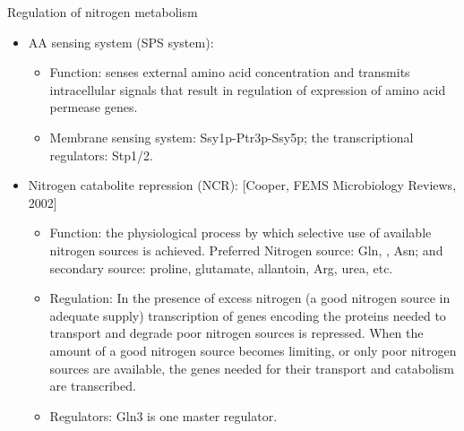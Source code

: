 \documentclass{report}
\begin{document}
Regulation of nitrogen metabolism
\begin{itemize}
\item AA sensing system (SPS system): 
\begin{itemize}
	\item Function: senses external amino acid concentration and transmits intracellular signals that result in regulation of expression of amino acid permease genes. 
	\item Membrane sensing system: Ssy1p-Ptr3p-Ssy5p; the transcriptional regulators: Stp1/2. 
\end{itemize}

\item Nitrogen catabolite repression (NCR): [Cooper, FEMS Microbiology Reviews, 2002]
\begin{itemize}
	\item Function: the physiological process by which selective use of available nitrogen sources is achieved. Preferred Nitrogen source: Gln, , Asn; and secondary source: proline, glutamate, allantoin, Arg, urea, etc. 
	\item Regulation: In the presence of excess nitrogen (a good nitrogen source in adequate supply) transcription of genes encoding the proteins needed to transport and degrade poor nitrogen sources is repressed. When the amount of a good nitrogen source becomes limiting, or only poor nitrogen sources are available, the genes needed for their transport and catabolism are transcribed. 
	\item Regulators: Gln3 is one master regulator. 
\end{itemize}
\end{itemize}
\end{document}
